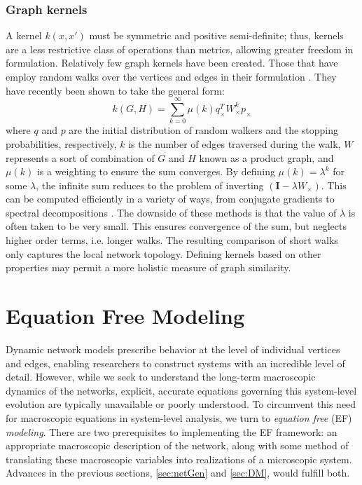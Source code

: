 \documentclass[11pt]{article}
\begin{document}
\subsubsection{Graph kernels}
\indent A kernel $k(x,x')$ must be symmetric and positive semi-definite; thus, kernels are a less restrictive class of operations than metrics, allowing greater freedom in formulation. Relatively few graph kernels have been created. Those that have employ random walks over the vertices and edges in their formulation \cite{Kashima2003} \cite{Borgwardt2008}. They have recently been shown to take the general form:
\[
k(G,H) = \sum\limits_{k=0}^{\infty}\mu(k)q_{\times}^{T}W_{\times}^{k}p_{\times}
\]
where $q$ and $p$ are the initial distribution of random walkers and the stopping probabilities, respectively, $k$ is the number of edges traversed during the walk, $W$ represents a sort of combination of $G$ and $H$ known as a product graph, and $\mu(k)$ is a weighting to ensure the sum converges. By defining $\mu(k) = \lambda^{k}$ for some $\lambda$, the infinite sum reduces to the problem of inverting $( \textbf{I} - \lambda W_{\times} )$. This can be computed efficiently in a variety of ways, from conjugate gradients to spectral decompositions \cite{Borgwardt2008}. The downside of these methods is that the value of $\lambda$ is often taken to be very small. This ensures convergence of the sum, but neglects higher order terms, i.e. longer walks. The resulting comparison of short walks only captures the local network topology. Defining kernels based on other properties may permit a more holistic measure of graph similarity.
\section{Equation Free Modeling}
\label{sec:EF}
\indent Dynamic network models prescribe behavior at the level of individual vertices and edges, enabling researchers to construct systems with an incredible level of detail. However, while we seek to understand the long-term macroscopic dynamics of the networks, explicit, accurate equations governing this system-level evolution are typically unavailable or poorly understood. To circumvent this need for macroscopic equations in system-level analysis, we turn to \textit{equation free} (EF) \textit{modeling}. There are two prerequisites to implementing the EF framework: an appropriate macroscopic description of the network, along with some method of translating these macroscopic variables into realizations of a microscopic system. Advances in the previous sections, \ref{sec:netGen} and \ref{sec:DM}, would fulfill both. 
\end{document}
